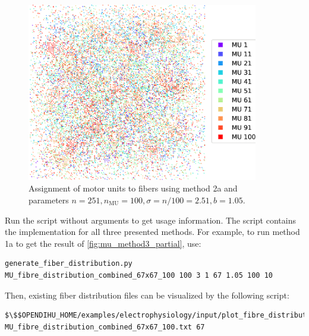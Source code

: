 \begin{figure}%
  \centering
  \includegraphics[width=0.9\textwidth]{images/motor_unit_assignment/MU_fibre_distribution_combined_sparse_251x251_100_2d_fiber_distribution_.png}%
  \caption{Assignment of motor units to fibers using method 2a and parameters $n=251, n_\text{MU}=100, \sigma = n/100 = 2.51, b=1.05$.}%
  \label{fig:mu_method3_2}%
\end{figure}%

\begin{reproduce}
  Run the script  without arguments to get usage information.
  The script contains the implementation for all three presented methods. For example, to run method 1a to get the result of \cref{fig:mu_method3_partial}, use:
  \begin{lstlisting}[columns=fullflexible,breaklines=true,postbreak=\mbox{\textcolor{gray}{$\hookrightarrow$}\space}]
    generate_fiber_distribution.py MU_fibre_distribution_combined_67x67_100 100 3 1 67 1.05 100 10
  \end{lstlisting}
  Then, existing fiber distribution files can be visualized by the following script:
  \begin{lstlisting}[columns=fullflexible,breaklines=true,postbreak=\mbox{\textcolor{gray}{$\hookrightarrow$}\space}]
    $\$$OPENDIHU_HOME/examples/electrophysiology/input/plot_fibre_distribution_2d.py MU_fibre_distribution_combined_67x67_100.txt 67
  \end{lstlisting}
\end{reproduce}

